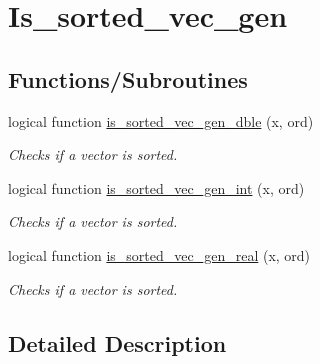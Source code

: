\hypertarget{group__is__sorted__vec__gen}{\section{Is\-\_\-sorted\-\_\-vec\-\_\-gen}
\label{group__is__sorted__vec__gen}
}
\subsection*{Functions/\-Subroutines}
\begin{DoxyCompactItemize}
\item 
logical function \hyperlink{group__is__sorted__vec__gen_gaa2f3726de3081bcd1ffc2c933b599e15_gaa2f3726de3081bcd1ffc2c933b599e15}{is\-\_\-sorted\-\_\-vec\-\_\-gen\-\_\-dble} (x, ord)
\begin{DoxyCompactList}\small\item\em Checks if a vector is sorted. \end{DoxyCompactList}\item 
logical function \hyperlink{group__is__sorted__vec__gen_ga8247dff28a2b27b1e5aa810e95118e47_ga8247dff28a2b27b1e5aa810e95118e47}{is\-\_\-sorted\-\_\-vec\-\_\-gen\-\_\-int} (x, ord)
\begin{DoxyCompactList}\small\item\em Checks if a vector is sorted. \end{DoxyCompactList}\item 
logical function \hyperlink{group__is__sorted__vec__gen_gab4f0da601876254726038a659e257671_gab4f0da601876254726038a659e257671}{is\-\_\-sorted\-\_\-vec\-\_\-gen\-\_\-real} (x, ord)
\begin{DoxyCompactList}\small\item\em Checks if a vector is sorted. \end{DoxyCompactList}\end{DoxyCompactItemize}


\subsection{Detailed Description}



